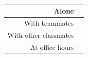 \documentclass[12pt]{article}
\begin{document}
\begin{tcolorbox}[fit,height=8em, width=40em, blank, borderline={1pt}{1pt},nobeforeafter]
\begin{table}[H]
    \centering
    \begin{tabular}{r|c}
        Alone &  \hspace{3em}  %
        \\ \hline
        With teammates & \hspace{3em}  %
        \\ \hline
        With other classmates & \hspace{3em}  %
        \\ \hline
        At office hours & \hspace{3em}  %
        \\ \hline
    \end{tabular}
        
\end{table}
\end{tcolorbox}
\end{document}
